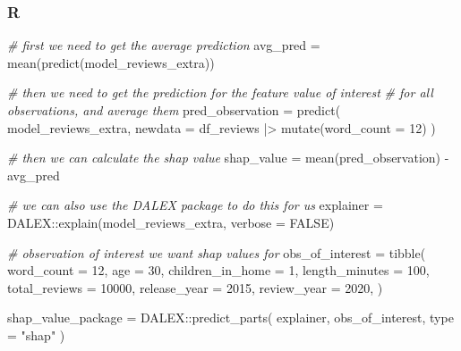 \documentclass[
  letterpaper,
]{krantz}
\newenvironment{Shaded}{}{}
\newcommand{\AttributeTok}[1]{\textcolor[rgb]{0.49,0.56,0.16}{#1}}
\newcommand{\CommentTok}[1]{\textcolor[rgb]{0.38,0.63,0.69}{\textit{#1}}}
\newcommand{\ConstantTok}[1]{\textcolor[rgb]{0.53,0.00,0.00}{#1}}
\newcommand{\DecValTok}[1]{\textcolor[rgb]{0.25,0.63,0.44}{#1}}
\newcommand{\FunctionTok}[1]{\textcolor[rgb]{0.02,0.16,0.49}{#1}}
\newcommand{\NormalTok}[1]{#1}
\newcommand{\OtherTok}[1]{\textcolor[rgb]{0.00,0.44,0.13}{#1}}
\newcommand{\SpecialCharTok}[1]{\textcolor[rgb]{0.25,0.44,0.63}{#1}}
\newcommand{\StringTok}[1]{\textcolor[rgb]{0.25,0.44,0.63}{#1}}
\begin{document}
\subsubsection{R}

\begin{Shaded}
\begin{Highlighting}[]
\CommentTok{\# first we need to get the average prediction}
\NormalTok{avg\_pred }\OtherTok{=} \FunctionTok{mean}\NormalTok{(}\FunctionTok{predict}\NormalTok{(model\_reviews\_extra))}


\CommentTok{\# then we need to get the prediction for the feature value of interest}
\CommentTok{\# for all observations, and average them}
\NormalTok{pred\_observation }\OtherTok{=} \FunctionTok{predict}\NormalTok{(}
\NormalTok{    model\_reviews\_extra,}
    \AttributeTok{newdata =}\NormalTok{ df\_reviews }\SpecialCharTok{|\textgreater{}} \FunctionTok{mutate}\NormalTok{(}\AttributeTok{word\_count =} \DecValTok{12}\NormalTok{)}
\NormalTok{)}

\CommentTok{\# then we can calculate the shap value}
\NormalTok{shap\_value }\OtherTok{=} \FunctionTok{mean}\NormalTok{(pred\_observation) }\SpecialCharTok{{-}}\NormalTok{ avg\_pred}

\CommentTok{\# we can also use the DALEX package to do this for us}
\NormalTok{explainer }\OtherTok{=}\NormalTok{ DALEX}\SpecialCharTok{::}\FunctionTok{explain}\NormalTok{(model\_reviews\_extra, }\AttributeTok{verbose =} \ConstantTok{FALSE}\NormalTok{)}

\CommentTok{\# observation of interest we want shap values for}
\NormalTok{obs\_of\_interest }\OtherTok{=} \FunctionTok{tibble}\NormalTok{(}
    \AttributeTok{word\_count =} \DecValTok{12}\NormalTok{,}
    \AttributeTok{age =} \DecValTok{30}\NormalTok{,}
    \AttributeTok{children\_in\_home =} \DecValTok{1}\NormalTok{,}
    \AttributeTok{length\_minutes =} \DecValTok{100}\NormalTok{,}
    \AttributeTok{total\_reviews =} \DecValTok{10000}\NormalTok{,}
    \AttributeTok{release\_year =} \DecValTok{2015}\NormalTok{,}
    \AttributeTok{review\_year =} \DecValTok{2020}\NormalTok{,}
\NormalTok{)}

\NormalTok{shap\_value\_package }\OtherTok{=}\NormalTok{ DALEX}\SpecialCharTok{::}\FunctionTok{predict\_parts}\NormalTok{(}
\NormalTok{    explainer,}
\NormalTok{    obs\_of\_interest,}
    \AttributeTok{type =} \StringTok{"shap"}
\NormalTok{)}
\end{Highlighting}
\end{Shaded}
\end{document}
